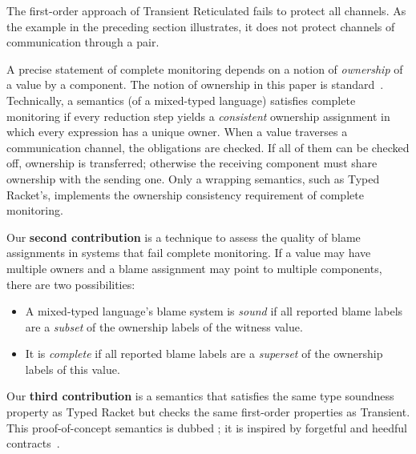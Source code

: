 The first-order approach of Transient Reticulated fails to protect all
channels. As the example in the preceding section illustrates, it does not
protect channels of communication through a pair.

A precise statement of complete monitoring depends on a notion of
\emph{ownership\/} of a value by a component.
The notion of ownership in this paper is standard~\cite{dfff-popl-2011,dtf-esop-2012}.
Technically, a semantics (of a mixed-typed language) satisfies complete monitoring
if every reduction step yields a \emph{consistent}\/ ownership assignment in
which every expression has a unique owner.
When a value traverses
a communication channel, the obligations are checked. If all of them can be
checked off, ownership is transferred; otherwise the receiving component must
share ownership with the sending one.
Only a wrapping semantics, such as Typed Racket's, implements
the ownership consistency requirement of complete monitoring.

Our {\bf second contribution} is a technique to assess the quality of blame
assignments in systems that fail complete monitoring.
If a value may have multiple owners and a blame assignment may
point to multiple components, there are two possibilities: 
\begin{itemize}

\item A mixed-typed language's blame system is {\em sound\/} if all
 reported blame labels are a {\em subset\/} of the ownership labels of
 the witness value.

\item It is {\em complete\/} if all reported blame labels are a {\em superset\/}
 of the ownership labels of this value.

\end{itemize}

Our {\bf third contribution} is a semantics that satisfies
the same type soundness property as Typed Racket but checks the same first-order
properties as Transient.
This proof-of-concept semantics is dubbed \Aname{}; it is inspired by
forgetful and heedful contracts~\cite{g-popl-2015}.

